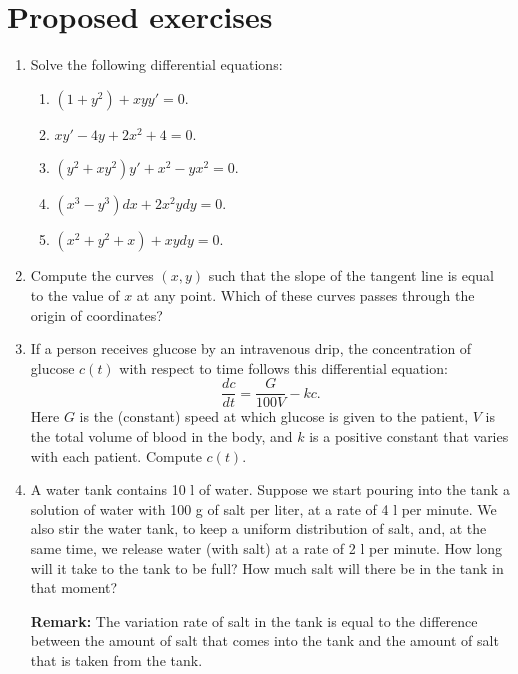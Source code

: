 \section{Proposed exercises}
\begin{enumerate}[leftmargin=*]

\item Solve the following differential equations:
\begin{enumerate}
\item $(1+y^{2})+xyy'=0$.
\item $xy'-4y+2x^2+4=0$.
\item $(y^{2}+xy^{2})y'+x^{2}-yx^{2}=0$.
\item $(x^3-y^3)dx+2x^2ydy=0$.
\item $(x^2+y^2+x)+xydy=0$.
\end{enumerate}

\item Compute the curves $(x,y)$ such that the slope of the tangent line is equal to the value of $x$ at any point.  
Which of these curves passes through the origin of coordinates?

\item If a person receives glucose by an intravenous drip, the concentration of glucose $c(t)$ with respect to time follows this differential equation:
\[
\frac{dc}{dt}=\frac{G}{100V}-kc.
\]
Here $G$ is the (constant) speed at which glucose is given to the patient, $V$ is the total volume of blood in the body, and $k$ is a positive constant that varies with each patient.
Compute $c(t)$.

\item A water tank contains 10 l of water.
Suppose we start pouring into the tank a solution of water with 100 g of salt per liter, at a rate of 4 l per minute.
We also stir the water tank, to keep a uniform distribution of salt, and, at the same time, we release water (with salt) at a rate of 2 l per minute.
How long will it take to the tank to be full?
How much salt will there be in the tank in that moment?

\noindent\textbf{Remark:} The variation rate of salt in the tank is equal to the difference between the amount of salt that comes into the tank and the amount of salt that is taken from the tank.
\end{enumerate}

